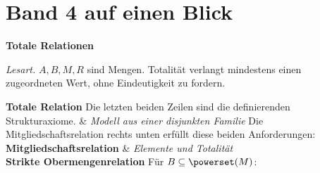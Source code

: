 \chapter[Band 4: Totale Relationen]{Band 4 auf einen Blick}
\noindent\textbf{Totale Relationen}\par\medskip
\noindent\emph{Lesart.} \(A,B,M,R\) sind Mengen. Totalität verlangt
mindestens einen zugeordneten Wert, ohne Eindeutigkeit zu fordern.
\begin{BandUebersicht}
\textbf{Totale Relation}
Die letzten beiden Zeilen sind die definierenden Strukturaxiome.
&
\textit{Modell aus einer disjunkten Familie}
Die Mitgliedschaftsrelation rechts unten erfüllt diese beiden
Anforderungen:
\\
\addlinespace[.8ex]
\textbf{Mitgliedschaftsrelation}
&
\textit{Elemente und Totalität}
\\
\addlinespace[.8ex]
\textbf{Strikte Obermengenrelation}
Für \(B\subseteq\powerset(M)\):

\end{BandUebersicht}
